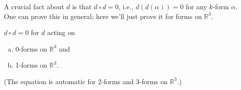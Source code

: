 A crucial fact about \(d\) is that \(d \circ d= 0\), i.e., \(d(d(\alpha)) = 0\) for any \(k\)-form \(\alpha\). One can prove this in general; here we'll just prove it for forms on \(\mathbb{R}^3\).

\begin{proposition}\label{ra.42b.hw14.prob.4}

\(d \circ d = 0\) for \(d\) acting on

\begin{enumerate}[(a)]

\item 0-forms on \(\mathbb{R}^3\) and

\item 1-forms on \(\mathbb{R}^3\).

\end{enumerate}

(The equation is automatic for 2-forms and 3-forms on \(\mathbb{R}^3\).)

\end{proposition}

